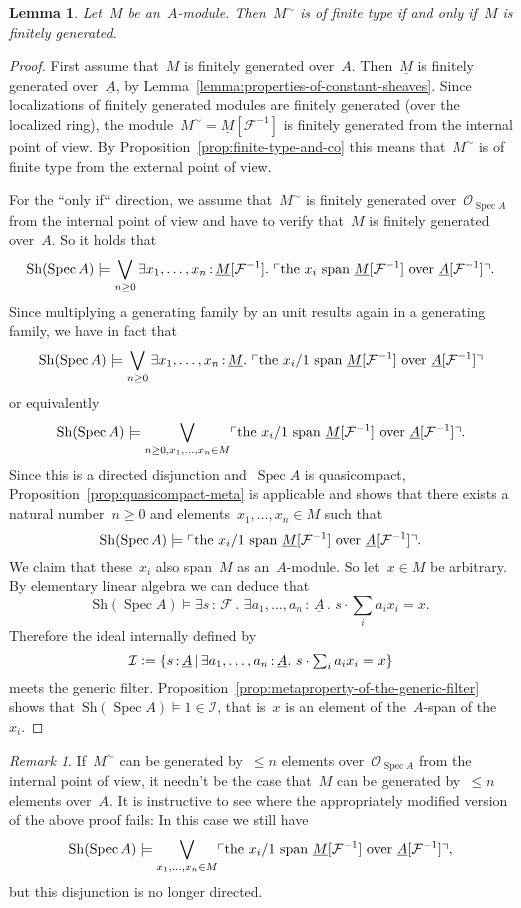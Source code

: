 \documentclass[10pt]{amsart}
\theoremstyle{definition}
\theoremstyle{plain}
\newtheorem{lemma}[defn]{Lemma}
\theoremstyle{remark}
\newtheorem{rem}[defn]{Remark}
\newcommand{\F}{\mathcal{F}}
\renewcommand{\O}{\mathcal{O}}
\newcommand{\I}{\mathcal{I}}
\newcommand{\ul}[1]{\underline{#1}}
\newcommand{\Sh}{\mathrm{Sh}}
\DeclareMathOperator{\Spec}{Spec}
\newcommand{\?}{\,{:}\,}
\renewcommand{\_}{\mathpunct{.}\,}
\newcommand{\speak}[1]{\ulcorner\text{\textnormal{#1}}\urcorner}
\newcommand{\defeq}{\vcentcolon=}
\begin{document}
\begin{lemma}Let~$M$ be an~$A$-module. Then~$M^\sim$ is of finite type if and
only if~$M$ is finitely generated.\end{lemma}
\begin{proof}First assume that~$M$ is finitely generated over~$A$.
Then~$\ul{M}$ is finitely generated over~$\ul{A}$, by
Lemma~\ref{lemma:properties-of-constant-sheaves}. Since localizations of
finitely generated modules are finitely generated (over the localized ring),
the module~$M^\sim = \ul{M}[\F^{-1}]$ is finitely generated from the internal
point of view. By Proposition~\ref{prop:finite-type-and-co} this means
that~$M^\sim$ is of finite type from the external point of view.

For the ``only if`` direction, we assume that~$M^\sim$ is finitely generated
over~$\O_{\Spec A}$ from the internal point of view and have to verify that~$M$
is finitely generated over~$A$. So it holds that
\[ \Sh(\Spec A) \models \bigvee_{n \geq 0}
  \exists x_1,\ldots,x_n\?\ul{M}[\F^{-1}]\_
  \speak{the $x_i$ span~$\ul{M}[\F^{-1}]$ over~$\ul{A}[\F^{-1}]$}. \]
Since multiplying a generating family by an unit results again in a generating
family, we have in fact that
\[ \Sh(\Spec A) \models \bigvee_{n \geq 0}
  \exists x_1,\ldots,x_n\?\ul{M}\_
  \speak{the $x_i/1$ span~$\ul{M}[\F^{-1}]$ over~$\ul{A}[\F^{-1}]$} \]
or equivalently
\[ \Sh(\Spec A) \models \bigvee_{n \geq 0, x_1,\ldots,x_n \in M}
  \speak{the $x_i/1$ span~$\ul{M}[\F^{-1}]$ over~$\ul{A}[\F^{-1}]$}. \]
Since this is a directed disjunction and~$\Spec A$ is quasicompact,
Proposition~\ref{prop:quasicompact-meta} is applicable and shows that there
exists a natural number~$n \geq 0$ and elements~$x_1,\ldots,x_n \in M$ such
that
\[ \Sh(\Spec A) \models \speak{the $x_i/1$ span~$\ul{M}[\F^{-1}]$
over~$\ul{A}[\F^{-1}]$}. \]
We claim that these~$x_i$ also span~$M$ as an~$A$-module. So let~$x \in M$ be
arbitrary. By elementary linear algebra we can deduce that
\[ \Sh(\Spec A) \models \exists s\?\F\_ \exists a_1,\ldots,a_n\?\ul{A}\_
  s \cdot \sum_i a_i x_i = x. \]
Therefore the ideal internally defined by
\[ \I \defeq \{ s\?\ul{A} \,|\, \exists a_1,\ldots,a_n\?\ul{A}\_
  s \cdot \textstyle\sum_i a_i x_i = x \} \]
meets the generic filter.
Proposition~\ref{prop:metaproperty-of-the-generic-filter} shows that~$\Sh(\Spec A)
\models 1 \in \I$, that is~$x$ is an element of the~$A$-span of the~$x_i$.
\end{proof}

\begin{rem}If~$M^\sim$ can be generated by~$\leq n$ elements over~$\O_{\Spec
A}$ from the internal point of view, it needn't be the case that~$M$ can be
generated by~$\leq n$ elements over~$A$. It is instructive to see where the
appropriately modified version of the above proof fails: In this case we still
have
\[ \Sh(\Spec A) \models \bigvee_{x_1,\ldots,x_n \in M}
  \speak{the $x_i/1$ span~$\ul{M}[\F^{-1}]$ over~$\ul{A}[\F^{-1}]$}, \]
but this disjunction is no longer directed.
\end{rem}
\end{document}
